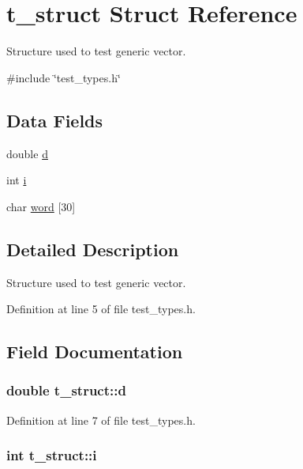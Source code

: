 \hypertarget{structt__struct}{\section{t\-\_\-struct Struct Reference}
\label{structt__struct}
}


Structure used to test generic vector.  




{\ttfamily \#include \char`\"{}test\-\_\-types.\-h\char`\"{}}

\subsection*{Data Fields}
\begin{DoxyCompactItemize}
\item 
double \hyperlink{structt__struct_a2029e2f2da88d23bcc9fa6ba45f51bf4}{d}
\item 
int \hyperlink{structt__struct_a488184c86cae0be164cfb634882b8f7a}{i}
\item 
char \hyperlink{structt__struct_ab5b290b572fc4036f1e5efc671098c7f}{word} \mbox{[}30\mbox{]}
\end{DoxyCompactItemize}


\subsection{Detailed Description}
Structure used to test generic vector. 



Definition at line 5 of file test\-\_\-types.\-h.



\subsection{Field Documentation}
\hypertarget{structt__struct_a2029e2f2da88d23bcc9fa6ba45f51bf4}{
\subsubsection[{d}]{\setlength{\rightskip}{0pt plus 5cm}double t\-\_\-struct\-::d}}\label{structt__struct_a2029e2f2da88d23bcc9fa6ba45f51bf4}


Definition at line 7 of file test\-\_\-types.\-h.

\hypertarget{structt__struct_a488184c86cae0be164cfb634882b8f7a}{
\subsubsection[{i}]{\setlength{\rightskip}{0pt plus 5cm}int t\-\_\-struct\-::i}}\label{structt__struct_a488184c86cae0be164cfb634882b8f7a}


